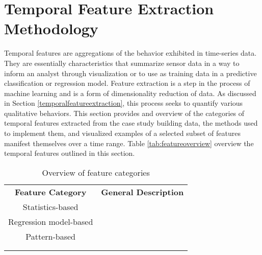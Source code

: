 \section{Temporal Feature Extraction Methodology}
\label{sec:featureextraction}

Temporal features are aggregations of the behavior exhibited in time-series data. They are essentially characteristics that summarize sensor data in a way to inform an analyst through visualization or to use as training data in a predictive classification or regression model. Feature extraction is a step in the process of machine learning and is a form of dimensionality reduction of data. As discussed in Section \ref{temporalfeatureextraction}, this process seeks to quantify various qualitative behaviors. This section provides and overview of the categories of temporal features extracted from the case study building data, the methods used to implement them, and visualized examples of a selected subset of features manifest themselves over a time range. Table \ref{tab:featureoverview} overview the temporal features outlined in this section.

\begin{table} 
    \begin{tabular}{ c c }
        \textbf{Feature Category} &  \textbf{General Description}\\ 
        Statistics-based &  \\ 
        Regression model-based &  \\ 
        Pattern-based &  \\ 
         &  \\ 
         &  \\ 
    \end{tabular} 
    \caption{Overview of feature categories}
\end{table}
\label{tab:featureoverview}

